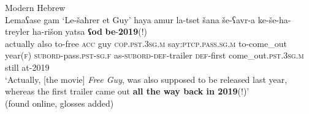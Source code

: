 \enlargethispage{\baselineskip}
\begin{exe}
	\ex Modern Hebrew\label{exTimeScalarHebrewFreeGuy}\\
	\gll Lemaʕase gam \lq{}Le-šaħrer et Guy\rq{} haya amur la-tset šana še-ʕavr-a ke-še-ha-treyler ha-rišon yatsa \textbf{ʕod} \textbf{be}-\textbf{2019}(!)\\
	actually also to-free \textsc{acc} guy \textsc{cop}.\textsc{pst}.3\textsc{sg}.\textsc{m} say:\textsc{ptcp}.\textsc{pass}.\textsc{sg}.\textsc{m} to-come\_out year(\textsc{f}) \textsc{subord}-pass.\textsc{pst}-\textsc{sg}.\textsc{f} as-\textsc{subord}-\textsc{def}-trailer \textsc{def}-first come\_out.\textsc{pst}.3\textsc{sg}.\textsc{m} still at-2019\\
	\glt \lq Actually, [the movie] \textit{Free Guy}, was also supposed to be released last year, whereas the first trailer came out \textbf{all the way back in 2019}(!)\rq{}
	\\ (found online, glosses added)%
\end{exe}

